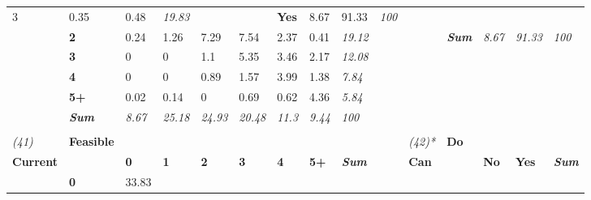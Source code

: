 \begin{table}
{\begin{threeparttable}
\begin{tabular}{lllllllllllllll}
  \cellcolor[HTML]{EEEEEE}3 &
  \cellcolor[HTML]{FDFDFD}0.35 &
  \cellcolor[HTML]{FDFDFD}0.48 &
  \textit{19.83} &
   &
   &
  \textbf{Yes} &
  \cellcolor[HTML]{F7F7F7}8.67 &
  \cellcolor[HTML]{A6A6A6}91.33 &
  \textit{100} \\
 &
  \textbf{2} &
  \cellcolor[HTML]{FEFEFE}0.24 &
  \cellcolor[HTML]{F8F8F8}1.26 &
  \cellcolor[HTML]{D5D5D5}7.29 &
  \cellcolor[HTML]{D3D3D3}7.54 &
  \cellcolor[HTML]{F2F2F2}2.37 &
  \cellcolor[HTML]{FDFDFD}0.41 &
  \textit{19.12} &
   &
   &
  \textit{\textbf{Sum}} &
  \textit{8.67} &
  \textit{91.33} &
  \textit{100} \\
 &
  \textbf{3} &
  \cellcolor[HTML]{FFFFFF}0 &
  \cellcolor[HTML]{FFFFFF}0 &
  \cellcolor[HTML]{F9F9F9}1.1 &
  \cellcolor[HTML]{E0E0E0}5.35 &
  \cellcolor[HTML]{EBEBEB}3.46 &
  \cellcolor[HTML]{F3F3F3}2.17 &
  \textit{12.08} &
   &
   &
   &
   &
   &
  \textit{} \\
 &
  \textbf{4} &
  \cellcolor[HTML]{FFFFFF}0 &
  \cellcolor[HTML]{FFFFFF}0 &
  \cellcolor[HTML]{FAFAFA}0.89 &
  \cellcolor[HTML]{F6F6F6}1.57 &
  \cellcolor[HTML]{E8E8E8}3.99 &
  \cellcolor[HTML]{F7F7F7}1.38 &
  \textit{7.84} &
   &
   &
   &
   &
   &
  \textit{} \\
 &
  \textbf{5+} &
  \cellcolor[HTML]{FFFFFF}0.02 &
  \cellcolor[HTML]{FFFFFF}0.14 &
  \cellcolor[HTML]{FFFFFF}0 &
  \cellcolor[HTML]{FBFBFB}0.69 &
  \cellcolor[HTML]{FCFCFC}0.62 &
  \cellcolor[HTML]{E6E6E6}4.36 &
  \textit{5.84} &
   &
   &
   &
   &
   &
  \textit{} \\
\textit{} &
  \textit{\textbf{Sum}} &
  \textit{8.67} &
  \textit{25.18} &
  \textit{24.93} &
  \textit{20.48} &
  \textit{11.3} &
  \textit{9.44} &
  \textit{100} &
  \textit{} &
  \textit{} &
  \textit{} &
  \textit{} &
  \textit{} &
  \textit{} \\
\textit{} &
  \textit{\textbf{}} &
  \textit{} &
  \textit{} &
  \textit{} &
  \textit{} &
  \textit{} &
  \textit{} &
  \textit{} &
  \textit{} &
  \textit{} &
  \textit{} &
  \textit{} &
  \textit{} &
  \textit{} \\
\textit{(41)} &
  \textbf{Feasible} &
   &
   &
   &
   &
   &
   &
  \textit{} &
   &
  \textit{(42)*} &
  \textbf{Do} &
   &
   &
  \textit{} \\
\textbf{Current} &
   &
  \textbf{0} &
  \textbf{1} &
  \textbf{2} &
  \textbf{3} &
  \textbf{4} &
  \textbf{5+} &
  \textit{\textbf{Sum}} &
  \textbf{} &
  \textbf{Can} &
   &
  \textbf{No} &
  \textbf{Yes} &
  \textit{\textbf{Sum}} \\
 &
  \textbf{0} &
  \cellcolor[HTML]{A6A6A6}33.83 &

\end{tabular}
\end{threeparttable}}
\end{table}
